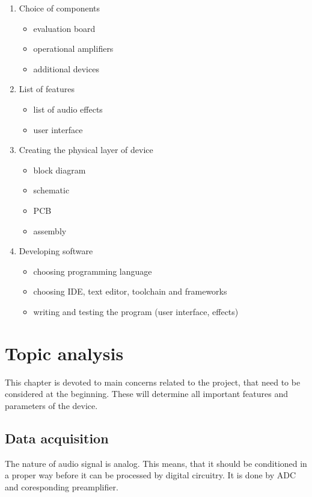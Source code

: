 \documentclass[a4paper,twoside,12pt]{book}
\begin{document}
\begin{enumerate}
    \item Choice of components
    \begin{itemize}
        \item evaluation board
        \item operational amplifiers
        \item additional devices
    \end{itemize}

    \item List of features
    \begin{itemize}
        \item list of audio effects
        \item user interface
    \end{itemize}

    \item Creating the physical layer of device
    \begin{itemize}
        \item block diagram
        \item schematic
        \item PCB
        \item assembly 
    \end{itemize}

    \item Developing software
    \begin{itemize}
        \item choosing programming language
        \item choosing IDE, text editor, toolchain and frameworks
        \item writing and testing the program (user interface, effects)
    \end{itemize}
\end{enumerate}




\chapter{Topic analysis}\label{ch:analysis}
This chapter is devoted to main concerns related to the project,
that need to be considered at the beginning.
These will determine all important features and parameters of the device.

\section{Data acquisition}
The nature of audio signal is analog. This means,
that it should be conditioned in a proper way before it can be processed by digital circuitry.
It is done by ADC and coresponding preamplifier.
\end{document}
